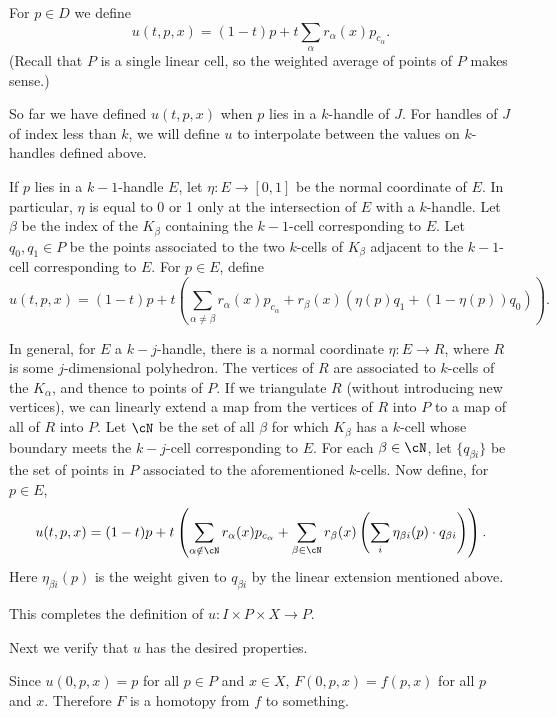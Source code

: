 \documentclass[11pt,leqno]{amsart}
\newcommand{\eq}[1]{\begin{displaymath}#1\end{displaymath}}
\begin{document}
For $p \in D$ we define
\eq{
    u(t, p, x) = (1-t)p + t \sum_\alpha r_\alpha(x) p_{c_\alpha} .
}
(Recall that $P$ is a single linear cell, so the weighted average of points of $P$
makes sense.)

So far we have defined $u(t, p, x)$ when $p$ lies in a $k$-handle of $J$.
For handles of $J$ of index less than $k$, we will define $u$ to
interpolate between the values on $k$-handles defined above.

If $p$ lies in a $k{-}1$-handle $E$, let $\eta : E \to [0,1]$ be the normal coordinate
of $E$.
In particular, $\eta$ is equal to 0 or 1 only at the intersection of $E$
with a $k$-handle.
Let $\beta$ be the index of the $K_\beta$ containing the $k{-}1$-cell
corresponding to $E$.
Let $q_0, q_1 \in P$ be the points associated to the two $k$-cells of $K_\beta$
adjacent to the $k{-}1$-cell corresponding to $E$.
For $p \in E$, define
\eq{
    u(t, p, x) = (1-t)p + t \left( \sum_{\alpha \ne \beta} r_\alpha(x) p_{c_\alpha}
            + r_\beta(x) (\eta(p) q_1 + (1-\eta(p)) q_0) \right) .
}

In general, for $E$ a $k{-}j$-handle, there is a normal coordinate
$\eta: E \to R$, where $R$ is some $j$-dimensional polyhedron.
The vertices of $R$ are associated to $k$-cells of the $K_\alpha$, and thence to points of $P$.
If we triangulate $R$ (without introducing new vertices), we can linearly extend
a map from the vertices of $R$ into $P$ to a map of all of $R$ into $P$.
Let $\cN$ be the set of all $\beta$ for which $K_\beta$ has a $k$-cell whose boundary meets
the $k{-}j$-cell corresponding to $E$.
For each $\beta \in \cN$, let $\{q_{\beta i}\}$ be the set of points in $P$ associated to the aforementioned $k$-cells.
Now define, for $p \in E$,
\eq{
    u(t, p, x) = (1-t)p + t \left(
            \sum_{\alpha \notin \cN} r_\alpha(x) p_{c_\alpha}
                + \sum_{\beta \in \cN} r_\beta(x) \left( \sum_i \eta_{\beta i}(p) \cdot q_{\beta i} \right)
             \right) .
}
Here $\eta_{\beta i}(p)$ is the weight given to $q_{\beta i}$ by the linear extension
mentioned above.

This completes the definition of $u: I \times P \times X \to P$.

\medskip

Next we verify that $u$ has the desired properties.

Since $u(0, p, x) = p$ for all $p\in P$ and $x\in X$, $F(0, p, x) = f(p, x)$ for all $p$ and $x$.
Therefore $F$ is a homotopy from $f$ to something.
\end{document}
